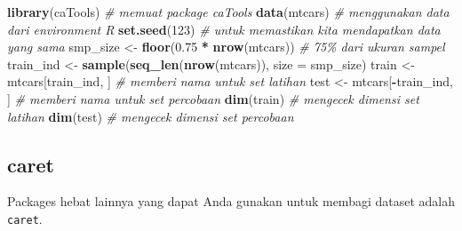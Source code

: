 \documentclass[
]{book}
\newenvironment{Shaded}{\begin{snugshade}}{\end{snugshade}}
\newcommand{\AttributeTok}[1]{\textcolor[rgb]{0.13,0.29,0.53}{#1}}
\newcommand{\CommentTok}[1]{\textcolor[rgb]{0.56,0.35,0.01}{\textit{#1}}}
\newcommand{\DecValTok}[1]{\textcolor[rgb]{0.00,0.00,0.81}{#1}}
\newcommand{\FloatTok}[1]{\textcolor[rgb]{0.00,0.00,0.81}{#1}}
\newcommand{\FunctionTok}[1]{\textcolor[rgb]{0.13,0.29,0.53}{\textbf{#1}}}
\newcommand{\NormalTok}[1]{#1}
\newcommand{\OtherTok}[1]{\textcolor[rgb]{0.56,0.35,0.01}{#1}}
\newcommand{\SpecialCharTok}[1]{\textcolor[rgb]{0.81,0.36,0.00}{\textbf{#1}}}
\begin{document}
\begin{Shaded}
\begin{Highlighting}[]
\FunctionTok{library}\NormalTok{(caTools)                                  }\CommentTok{\# memuat package \textasciigrave{}caTools\textasciigrave{}}
\FunctionTok{data}\NormalTok{(mtcars)                                      }\CommentTok{\# menggunakan data dari environment R}
\FunctionTok{set.seed}\NormalTok{(}\DecValTok{123}\NormalTok{)                                     }\CommentTok{\# untuk memastikan kita mendapatkan data yang sama}
\NormalTok{smp\_size }\OtherTok{\textless{}{-}} \FunctionTok{floor}\NormalTok{(}\FloatTok{0.75} \SpecialCharTok{*} \FunctionTok{nrow}\NormalTok{(mtcars))            }\CommentTok{\# 75\% dari ukuran sampel}
\NormalTok{train\_ind }\OtherTok{\textless{}{-}} \FunctionTok{sample}\NormalTok{(}\FunctionTok{seq\_len}\NormalTok{(}\FunctionTok{nrow}\NormalTok{(mtcars)), }
                    \AttributeTok{size =}\NormalTok{ smp\_size)}
\NormalTok{train }\OtherTok{\textless{}{-}}\NormalTok{ mtcars[train\_ind, ]                      }\CommentTok{\# memberi nama untuk set latihan}
\NormalTok{test }\OtherTok{\textless{}{-}}\NormalTok{ mtcars[}\SpecialCharTok{{-}}\NormalTok{train\_ind, ]                      }\CommentTok{\# memberi nama untuk set percobaan}
\FunctionTok{dim}\NormalTok{(train)                                        }\CommentTok{\# mengecek dimensi set latihan}
\FunctionTok{dim}\NormalTok{(test)                                         }\CommentTok{\# mengecek dimensi set percobaan}
\end{Highlighting}
\end{Shaded}

\hypertarget{caret}{%
\subsection{caret}\label{caret}}

Packages hebat lainnya yang dapat Anda gunakan untuk membagi dataset adalah \texttt{caret}.
\end{document}

